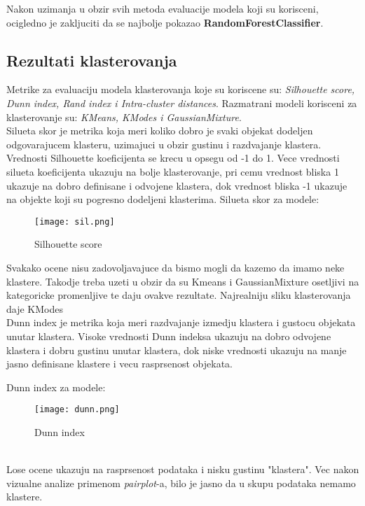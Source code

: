 \documentclass[10pt]{article}
\begin{document}
Nakon uzimanja u obzir svih metoda evaluacije modela koji su korisceni, ocigledno je zakljuciti da se najbolje pokazao \textbf{RandomForestClassifier}.

\pagebreak
\subsection*{Rezultati klasterovanja}
Metrike za evaluaciju modela klasterovanja koje su koriscene su: \textit{Silhouette score, Dunn index, Rand index i Intra-cluster distances}. Razmatrani modeli korisceni za klasterovanje su: \textit{KMeans, KModes i GaussianMixture}.\\

Silueta skor je metrika koja meri koliko dobro je svaki objekat dodeljen odgovarajucem klasteru, uzimajuci u obzir gustinu i razdvajanje klastera. Vrednosti Silhouette koeficijenta se krecu u opsegu od -1 do 1. Vece vrednosti silueta koeficijenta ukazuju na bolje klasterovanje, pri cemu vrednost bliska 1 ukazuje na dobro definisane i odvojene klastera, dok vrednost bliska -1 ukazuje na objekte koji su pogresno dodeljeni klasterima. Silueta skor za modele: 
\begin{figure}[h]
    \centering
    \texttt{[image: sil.png]}
    \caption{Silhouette score}
    \label{Slika11}
\end{figure}

Svakako ocene nisu zadovoljavajuce da bismo mogli da kazemo da imamo neke klastere.
Takodje treba uzeti u obzir da su Kmeans i GaussianMixture osetljivi na kategoricke promenljive te daju ovakve rezultate.
Najrealniju sliku klasterovanja daje KModes\\

Dunn index je metrika koja meri razdvajanje izmedju klastera i gustocu objekata unutar klastera. Visoke vrednosti Dunn indeksa ukazuju na dobro odvojene klastera i dobru gustinu unutar klastera, dok niske vrednosti ukazuju na manje jasno definisane klastere i vecu rasprsenost objekata.\pagebreak

Dunn index za modele:
\begin{figure}[h]
    \centering
    \texttt{[image: dunn.png]}
    \caption{Dunn index}
    \label{Slika12}
\end{figure}
\\

Lose ocene ukazuju na rasprsenost podataka i nisku gustinu "klastera". Vec nakon vizualne analize primenom \textit{pairplot}-a, bilo je jasno da u skupu podataka nemamo klastere.\\
\end{document}
